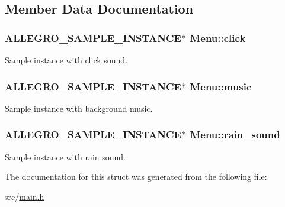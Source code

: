 \subsection{\-Member \-Data \-Documentation}
\hypertarget{structMenu_a8f8e8b511a64f03e71259dde1a7bf6f2}{
\subsubsection[{click}]{\setlength{\rightskip}{0pt plus 5cm}\-A\-L\-L\-E\-G\-R\-O\-\_\-\-S\-A\-M\-P\-L\-E\-\_\-\-I\-N\-S\-T\-A\-N\-C\-E$\ast$ {\bf \-Menu\-::click}}}\label{structMenu_a8f8e8b511a64f03e71259dde1a7bf6f2}
\-Sample instance with click sound. \hypertarget{structMenu_a7b8c42bd64118eb18dceafbd9ac8b3d5}{
\subsubsection[{music}]{\setlength{\rightskip}{0pt plus 5cm}\-A\-L\-L\-E\-G\-R\-O\-\_\-\-S\-A\-M\-P\-L\-E\-\_\-\-I\-N\-S\-T\-A\-N\-C\-E$\ast$ {\bf \-Menu\-::music}}}\label{structMenu_a7b8c42bd64118eb18dceafbd9ac8b3d5}
\-Sample instance with background music. \hypertarget{structMenu_a31b58f4005206ba8ecc4b6f40223295f}{
\subsubsection[{rain\-\_\-sound}]{\setlength{\rightskip}{0pt plus 5cm}\-A\-L\-L\-E\-G\-R\-O\-\_\-\-S\-A\-M\-P\-L\-E\-\_\-\-I\-N\-S\-T\-A\-N\-C\-E$\ast$ {\bf \-Menu\-::rain\-\_\-sound}}}\label{structMenu_a31b58f4005206ba8ecc4b6f40223295f}
\-Sample instance with rain sound. 

\-The documentation for this struct was generated from the following file\-:\begin{DoxyCompactItemize}
\item 
src/\hyperlink{main_8h}{main.\-h}\end{DoxyCompactItemize}

